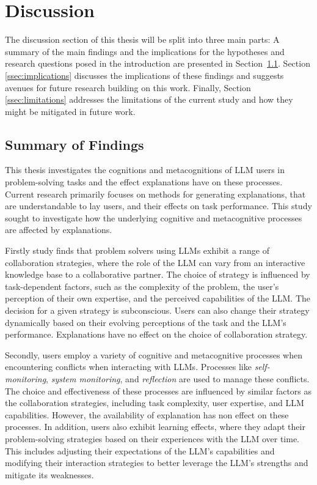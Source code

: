 \section{Discussion} \label{sec:discussion}

The discussion section of this thesis will be split into three main parts: A summary of the main findings and the implications for the hypotheses and research questions posed in the introduction are presented in Section~\ref{ssec:summary}. Section \ref{ssec:implications} discusses the implications of these findings and suggests avenues for future research building on this work. Finally, Section \ref{ssec:limitations} addresses the limitations of the current study and how they might be mitigated in future work.

\subsection{Summary of Findings} \label{ssec:summary}

This thesis investigates the cognitions and metacognitions of LLM users in problem-solving tasks and the effect explanations have on these processes. Current research primarily focuses on methods for generating explanations, that are understandable to lay users, and their effects on task performance. This study sought to investigate how the underlying cognitive and metacognitive processes are affected by explanations.

Firstly study finds that problem solvers using LLMs exhibit a range of collaboration strategies, where the role of the LLM can vary from an interactive knowledge base to a collaborative partner. The choice of strategy is influenced by task-dependent factors, such as the complexity of the problem, the user's perception of their own expertise, and the perceived capabilities of the LLM. The decision for a given strategy is subconscious. Users can also change their strategy dynamically based on their evolving perceptions of the task and the LLM's performance. Explanations have no effect on the choice of collaboration strategy.

Secondly, users employ a variety of cognitive and metacognitive processes when encountering conflicts when interacting with LLMs. Processes like \textit{self-monitoring}, \textit{system monitoring}, and \textit{reflection} are used to manage these conflicts. The choice and effectiveness of these processes are influenced by similar factors as the collaboration strategies, including task complexity, user expertise, and LLM capabilities. However, the availability of explanation has non effect on these processes. In addition, users also exhibit learning effects, where they adapt their problem-solving strategies based on their experiences with the LLM over time. This includes adjusting their expectations of the LLM's capabilities and modifying their interaction strategies to better leverage the LLM's strengths and mitigate its weaknesses.


